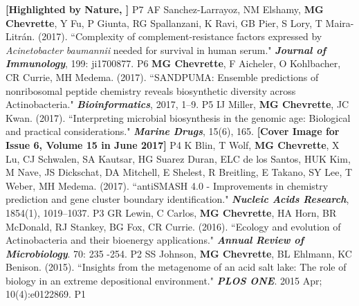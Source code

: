 \begin{cvpubs}
{    \linebreak \textbf{[Highlighted by Nature, \textit{}]}
    } %
    {P7} %
  \cvpub
    {AF Sanchez-Larrayoz, NM Elshamy, \textbf{MG Chevrette}, Y Fu, P Giunta, RG Spallanzani, K Ravi, GB Pier, S Lory, T Maira-Litr\'{a}n. (2017). ``Complexity of complement-resistance factors expressed by \textit{Acinetobacter baumannii} needed for survival in human serum." \textit{\textbf{Journal of Immunology}}, 199: ji1700877. \textbf{\textit{}} }%
    {P6} %
  \cvpub
    {\textbf{MG Chevrette}, F Aicheler, O Kohlbacher, CR Currie, MH Medema. (2017). ``SANDPUMA: Ensemble predictions of nonribosomal peptide chemistry reveals biosynthetic diversity across Actinobacteria." \textit{\textbf{Bioinformatics}}, 2017, 1–9. \textbf{\textit{}} } %
    {P5} %
  \cvpub
    {IJ Miller, \textbf{MG Chevrette}, JC Kwan. (2017). ``Interpreting microbial biosynthesis in the genomic age: Biological and practical considerations." \textit{\textbf{Marine Drugs}}, 15(6), 165. \textbf{\textit{}} 
	\linebreak \textbf{[Cover Image for Issue 6, Volume 15 in June 2017]}    
    } %
    {P4} %
  \cvpub
    {K Blin, T Wolf, \textbf{MG Chevrette}, X Lu, CJ Schwalen, SA Kautsar, HG Suarez Duran, ELC de los Santos, HUK Kim, M Nave, JS Dickschat, DA Mitchell, E Shelest, R Breitling, E Takano, SY Lee, T Weber, MH Medema. (2017). ``antiSMASH 4.0 - Improvements in chemistry prediction and gene cluster boundary identification." \textit{\textbf{Nucleic Acids Research}}, 1854(1), 1019–1037. \textbf{\textit{}} }  %
    {P3} %
  \cvpub
    {GR Lewin, C Carlos, \textbf{MG Chevrette}, HA Horn, BR McDonald, RJ Stankey, BG Fox, CR Currie. (2016). ``Ecology and evolution of Actinobacteria and their bioenergy applications." \textit{\textbf{Annual Review of Microbiology}}. 70: 235 -254. \textbf{\textit{}} } %
    {P2} %
  \cvpub
    {SS Johnson, \textbf{MG Chevrette}, BL Ehlmann, KC Benison. (2015). ``Insights from the metagenome of an acid salt lake: The role of biology in an extreme depositional environment."  \textit{\textbf{PLOS ONE}}. 2015 Apr; 10(4):e0122869. \textbf{\textit{}} } %
    {P1} %
\end{cvpubs}

